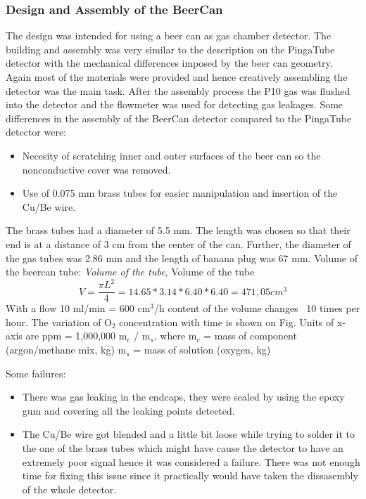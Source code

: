 \subsubsection{Design and Assembly of the BeerCan}
\label{sec:design_and_assembly_beercan}
The design was intended for using a beer can as gas chamber detector. The
building and assembly was very similar to the description on the PingaTube
detector with the mechanical differences imposed by the beer can geometry.
Again most of the materials were provided and hence creatively assembling the
detector was the main task. After the assembly process the P10 gas was flushed
into the detector and the flowmeter was used for detecting gas leakages.  Some
differences in the assembly of the BeerCan detector compared to the PingaTube
detector were:
\begin{itemize}
\item Necesity of scratching inner and outer surfaces of the beer can so the
  nonconductive cover was removed.
\item Use of 0.075 mm brass tubes for easier manipulation and insertion of the
  Cu/Be wire.
\end{itemize}
The brass tubes had a diameter of 5.5 mm. The length was chosen so that their
end is at a distance of 3 cm from the center of the can. Further, the diameter
of the gas tubes was 2.86 mm and the length of banana plug was 67 mm.
Volume of the beercan tube: \emph{Volume of the tube}, Volume of the tube
\begin{equation}
  \label{eq:tube_volume}
  V=\frac{\pi L^2}{4} =14.65*3.14*6.40*6.40=471,05 cm^3
\end{equation}
With a flow 10 ml/min = 600 cm$^3$/h content of the volume changes ~10 times per
hour. The variation of O$_{2}$ concentration with time is shown on Fig. Units of
x-axis are ppm = 1,000,000 m$_{c}$ / m$_{s}$, where m$_{c}$ = mass of component
(argon/methane mix, kg) m$_{s}$ = mass of solution (oxygen, kg)

Some failures:
\begin{itemize}
\item There was gas leaking in the endcaps, they were sealed by using the epoxy
  gum and covering all the leaking points detected.
\item The Cu/Be wire got blended and a little bit loose while trying to solder
  it to the one of the brass tubes which might have cause the detector to have
  an extremely poor signal hence it was considered a failure. There was not
  enough time for fixing this issue since it practically would have taken the
  dissasembly of the whole detector.
\end{itemize}

